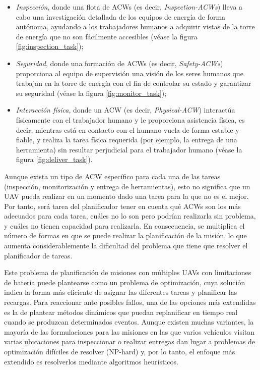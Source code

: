 \documentclass[fontsize=11pt, English=false, Español=true, Myfinal=true, twoside, numbers=noenddot]{scrbook}
\begin{document}
{\begin{itemize}
    \item \textit{Inspección}, donde una flota de \glspl{ACW} (es decir, \textit{Inspection-ACWs}) lleva a cabo una investigación detallada de los equipos de energía de forma autónoma, ayudando a los trabajadores humanos a adquirir vistas de la torre de energía que no son fácilmente accesibles (véase la figura \ref{fig:inspection_task});
    \item \textit{Seguridad}, donde una formación de \glspl{ACW} (es decir, \textit{Safety-ACWs}) proporciona al equipo de supervisión una visión de los seres humanos que trabajan en la torre de energía con el fin de controlar su estado y garantizar su seguridad (véase la figura \ref{fig:monitor_task});
    \item \textit{Interacción física}, donde un \gls{ACW} (es decir, \textit{Physical-ACW}) interactúa físicamente con el trabajador humano y le proporciona asistencia física, es decir, mientras está en contacto con el humano vuela de forma estable y fiable, y realiza la tarea física requerida (por ejemplo, la entrega de una herramienta) sin resultar perjudicial para el trabajador humano (véase la figura \ref{fig:deliver_task}).
\end{itemize} 

Aunque exista un tipo de \gls{ACW} específico para cada una de las tareas (inspección, monitorización y entrega de herramientas), esto no significa que un \gls{UAV} pueda realizar en un momento dado una tarea para la que no es el mejor. Por tanto, será tarea del planificador tener en cuenta qué \glspl{ACW} son los más adecuados para cada tarea, cuáles no lo son pero podrían realizarla sin problema, y cuáles no tienen capacidad para realizarla. En consecuencia, se multiplica el número de formas en que se puede realizar la planificación de la misión, lo que aumenta considerablemente la dificultad del problema que tiene que resolver el planificador de tareas.

Este problema de planificación de misiones con múltiples \glspl{UAV} con limitaciones de batería puede plantearse como un problema de optimización, cuya solución indica la forma más eficiente de asignar las diferentes tareas y planificar las recargas. Para reaccionar ante posibles fallos, una de las opciones más extendidas es la de plantear métodos dinámicos que puedan replanificar en tiempo real cuando se produzcan determinados eventos. Aunque existen muchas variantes, la mayoría de las formulaciones para las misiones en las que varios vehículos visitan varias ubicaciones para inspeccionar o realizar entregas dan lugar a problemas de optimización difíciles de resolver (NP-hard) y, por lo tanto, el enfoque más extendido es resolverlos mediante algoritmos heurísticos.

}
\end{document}
